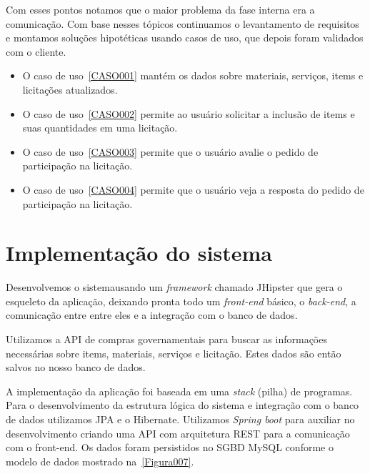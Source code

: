 Com esses pontos notamos que o maior problema da fase interna era a comunicação. 
Com base nesses tópicos continuamos o levantamento de requisitos e montamos soluções hipotéticas usando casos de uso, que depois foram validados com o cliente.

\begin{itemize}
    \item O caso de uso~\ref{CASO001} mantém os dados sobre  materiais, serviços, items e licitações atualizados.
    
    \item O caso de uso~\ref{CASO002} permite ao usuário solicitar a inclusão de items e suas quantidades em uma licitação.

    \item O caso de uso~\ref{CASO003} permite que o usuário avalie o pedido de participação na licitação.
    
    \item O caso de uso~\ref{CASO004} permite que o usuário veja a resposta do pedido de participação na licitação.

\end{itemize}


\section{Implementação do sistema}

Desenvolvemos o sistemausando um \textit{framework} chamado JHipster que gera o esqueleto da aplicação, deixando pronta todo um \textit{front-end} básico, o \textit{back-end}, a comunicação entre entre eles e a integração com o banco de dados.


Utilizamos a API de compras governamentais para buscar as informações necessárias sobre items, materiais, serviços e licitação.
Estes dados são então salvos no nosso banco de dados.

A implementação da aplicação foi baseada em uma \textit{stack} (pilha) de programas.
Para o desenvolvimento da estrutura lógica do sistema e integração com o banco de dados utilizamos JPA e o Hibernate.
Utilizamos \textit{Spring boot} para auxiliar no desenvolvimento criando uma API com arquitetura REST para a comunicação com o front-end.
Os dados foram persistidos no SGBD MySQL conforme o modelo de dados mostrado na~\ref{Figura007}.

